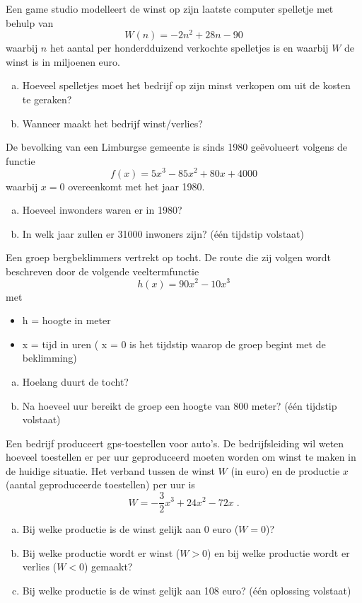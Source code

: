 \documentclass[12pt,twoside,a4paper]{article}
\begin{document}
\begin{oefening}
Een game studio modelleert de winst op zijn laatste computer spelletje met behulp van
$$W(n)=-2n^2+28n-90$$ waarbij $n$ het aantal per honderdduizend verkochte spelletjes is en waarbij $W$ de winst is in miljoenen euro.
\begin{enumerate}[(a)]
  \item Hoeveel spelletjes moet het bedrijf op zijn minst verkopen om uit de kosten te geraken?
  \item Wanneer maakt het bedrijf winst/verlies?
\end{enumerate}
\end{oefening}

\begin{oefening}
De bevolking van een Limburgse gemeente is sinds 1980 geëvolueert volgens de functie $$f(x)=5x^3-85x^2+80x+4000$$ waarbij $x=0$ overeenkomt met het jaar 1980.
\begin{enumerate}[(a)]
  \item Hoeveel inwonders waren er in 1980?
  \item In welk jaar zullen er 31000 inwoners zijn? (één tijdstip volstaat)
\end{enumerate}
\end{oefening}

\begin{oefening}
Een groep bergbeklimmers vertrekt op tocht.  De route die zij volgen wordt beschreven	door de volgende veeltermfunctie $$h(x)=90x^2-10x^3$$ met
\begin{itemize}
  \item h = hoogte in meter
  \item x = tijd in uren ( x = 0 is het tijdstip waarop de groep begint met de beklimming)
\end{itemize}
\begin{enumerate}[(a)]
  \item Hoelang duurt de tocht?
  \item Na hoeveel uur bereikt de groep een hoogte van 800 meter? (één tijdstip volstaat)
\end{enumerate}
\end{oefening}

\begin{oefening}
Een bedrijf produceert gps-toestellen voor auto’s.  De bedrijfsleiding wil weten hoeveel toestellen er per uur geproduceerd moeten worden om winst te maken in de huidige situatie.  Het verband tussen de winst $W$ (in euro) en de productie $x$ (aantal geproduceerde toestellen) per uur is
$$W=-\dfrac{3}{2}x^3+24x^2-72x\;.$$
\begin{enumerate}[(a)]
  \item Bij welke productie is de winst gelijk aan 0 euro ($W = 0$)?
  \item Bij welke productie wordt er winst ($W > 0$) en bij welke productie wordt er verlies ($W < 0$) gemaakt?
  \item Bij welke productie is de winst gelijk aan 108 euro?  (één oplossing volstaat)
\end{enumerate}
\end{oefening}
\end{document}
